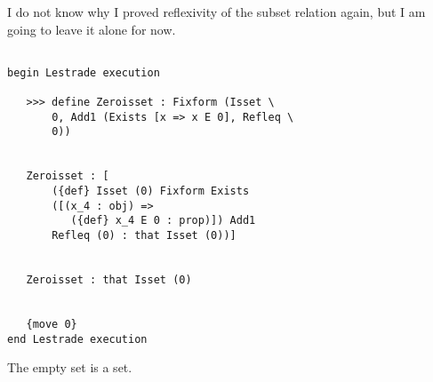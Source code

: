 \documentclass[12pt]{article}
\begin{document}
I do not know why I proved reflexivity of the subset relation again, but I am going to leave it alone for now.

\begin{verbatim}

begin Lestrade execution

   >>> define Zeroisset : Fixform (Isset \
       0, Add1 (Exists [x => x E 0], Refleq \
       0))


   Zeroisset : [
       ({def} Isset (0) Fixform Exists 
       ([(x_4 : obj) => 
          ({def} x_4 E 0 : prop)]) Add1 
       Refleq (0) : that Isset (0))]


   Zeroisset : that Isset (0)


   {move 0}
end Lestrade execution
\end{verbatim}

The empty set is a set.
\end{document}
